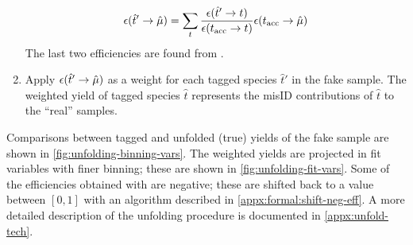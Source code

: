 \begin{enumerate}
        \begin{equation}
            \misEff[\hat{t}']{\hat{\mu}} =
                \sum_{t}
                \frac{\misEff[\hat{t}']{t}}{\misEff[t_\text{acc}]{t}}
                \misEff[t_\text{acc}]{\hat{\mu}}
        \end{equation}
        The last two efficiencies are found from \pidcalib.

    \item Apply $\misEff[\hat{t}']{\hat{\mu}}$ as a weight for each
        tagged species $\hat{t}'$ in the fake \muon sample.
        The weighted yield of tagged species $\hat{t}$ represents the \muon misID
        contributions of $\hat{t}$ to the ``real'' \muon samples.
\end{enumerate}

Comparisons between tagged and unfolded (true) yields of the fake \muon sample
are shown in \cref{fig:unfolding-binning-vars}.
The weighted yields are projected in fit variables with finer binning;
these are shown in \cref{fig:unfolding-fit-vars}.
Some of the efficiencies obtained with \pidcalib are negative; these are shifted
back to a value between $[0, 1]$ with an algorithm described in
\cref{appx:formal:shift-neg-eff}.
A more detailed description of the unfolding procedure is documented in
\cref{appx:unfold-tech}.

